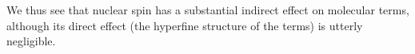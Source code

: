 We thus see that nuclear spin has a substantial indirect effect on molecular terms, although its
direct effect (the hyperfine structure of the terms) is utterly negligible.
